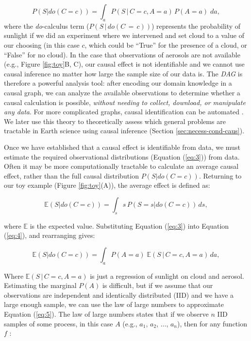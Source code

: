 \documentclass[12pt]{article}
\begin{document}
\begin{equation} P(S | do(C = c)) = \int_{a} P(S \, | \, C = c, A=a)
  \, P(A=a) \; da,
  \label{eq:3}
\end{equation} where the \textit{do}-calculus \citep{pearl2009} term
($P(S \, | \, do(C\, = \,c))$) represents the probability of sunlight
if we did an experiment where we intervened and set cloud to a value
of our choosing (in this case $c$, which could be ``True'' for the
presence of a cloud, or ``False'' for no cloud). In the case that
observations of aerosols are not available (e.g., Figure
\ref{fig:toy}B, C), our causal effect is not identifiable and we
cannot use causal inference no matter how large the sample size of our
data is. The \emph{DAG} is therefore a powerful analysis tool: after encoding
our domain knowledge in a causal graph, we can analyze the available
observations to determine whether a causal calculation is possible,
\textit{without needing to collect, download, or manipulate any
  data}. For more complicated graphs, causal identification can be
automated \citep[][ \url{http://www.dagitty.net/}]{shpitser2006,
  textor2017}. We later use this theory to theoretically assess which
general problems are tractable in Earth science using causal inference
(Section \ref{sec:necess-cond-caus}).

Once we have established that a causal effect is identifiable from
data, we must estimate the required observational distributions
(Equation (\ref{eq:3})) from data. Often it may be more
computationally tractable to calculate an average causal effect,
rather than the full causal distribution $P(S | do(C=c))$. Returning
to our toy example (Figure \ref{fig:toy}(A)), the average effect is
defined as:

\begin{equation} \mathbb{E}(S | do(C = c)) = \int_{s} s \, P(S = s |
  do(C=c)) \, ds,
  \label{eq:4}
\end{equation}

where $\mathbb{E}$ is the expected value. Substituting Equation
(\ref{eq:3}) into Equation (\ref{eq:4}), and rearranging gives:

\begin{equation} \mathbb{E}(S | do(C = c)) = \int_{a} P(A=a) \;
  \mathbb{E}(S \, | \, C=c, A=a) \, d a,
  \label{eq:5}
\end{equation}

Where $\mathbb{E}(S \, | \, C=c, A=a)$ is just a regression of
sunlight on cloud and aerosol. Estimating the marginal $P(A)$ is
difficult, but if we assume that our observations are independent and
identically distributed (IID) and we have a large enough sample, we
can use the law of large numbers to approximate Equation
(\ref{eq:5}). The law of large numbers states that if we observe $n$
IID samples of some process, in this case $A$ (e.g., $a_1$, $a_2$,
$\ldots$, $a_n$), then for any function $f$ \citep{shalizi2013}:
\end{document}
